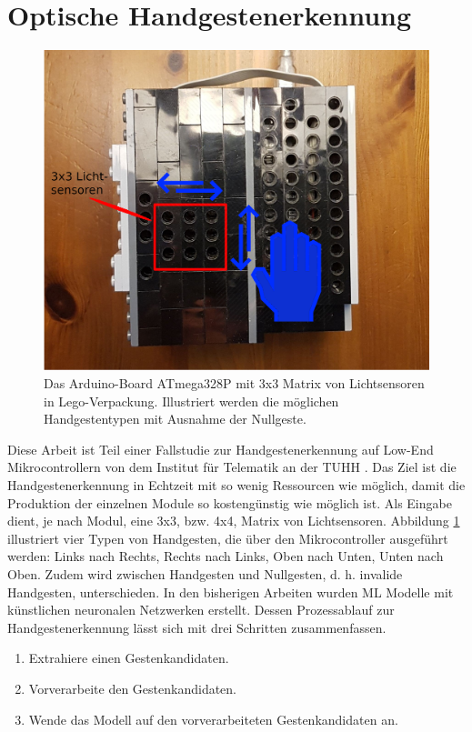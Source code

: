 \section{Optische Handgestenerkennung}
\label{sec:fallstudie}
\begin{figure}
    \centering
    \includegraphics[width=0.6\linewidth]{images/arduino_ex.png}
    \caption{Das Arduino-Board ATmega328P mit 3x3 Matrix von Lichtsensoren in Lego-Verpackung. Illustriert werden die möglichen Handgestentypen mit Ausnahme der Nullgeste.}
    \label{fig:arduino_ex}
\end{figure}
Diese Arbeit ist Teil einer Fallstudie zur Handgestenerkennung auf Low-End Mikrocontrollern von dem Institut für Telematik an der TUHH \cite{venzkeArticle}. Das Ziel ist die Handgestenerkennung in Echtzeit mit so wenig
Ressourcen wie möglich, damit die Produktion der einzelnen Module so kostengünstig wie möglich ist. Als Eingabe dient, je nach Modul, eine 3x3, bzw. 4x4, Matrix von Lichtsensoren. Abbildung \ref{fig:arduino_ex}
illustriert vier Typen von Handgesten, die über den Mikrocontroller ausgeführt werden: Links nach Rechts, Rechts nach Links, Oben nach Unten, Unten nach Oben. Zudem wird zwischen Handgesten und Nullgesten, d. h.
invalide Handgesten, unterschieden. In den bisherigen Arbeiten wurden ML Modelle mit künstlichen neuronalen Netzwerken erstellt. Dessen Prozessablauf zur Handgestenerkennung lässt sich mit drei
Schritten zusammenfassen.
\begin{enumerate}
    \item Extrahiere einen Gestenkandidaten.
    \item Vorverarbeite den Gestenkandidaten.
    \item Wende das Modell auf den vorverarbeiteten Gestenkandidaten an.
\end{enumerate}





